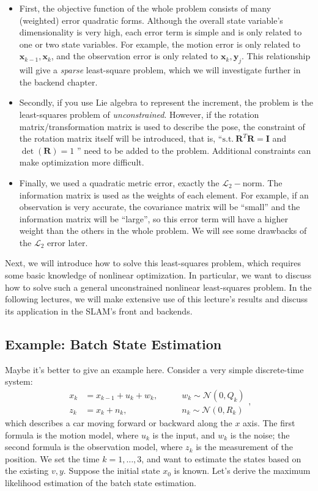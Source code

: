 \begin{itemize}
	\item First, the objective function of the whole problem consists of many (weighted) error quadratic forms. Although the overall state variable's dimensionality is very high, each error term is simple and is only related to one or two state variables. For example, the motion error is only related to $\mathbf{x}_{k-1}, \mathbf{x}_k$, and the observation error is only related to $\mathbf{x}_k, \mathbf{y}_j$. This relationship will give a \textit{sparse} least-square problem, which we will investigate further in the backend chapter.
	\item Secondly, if you use Lie algebra to represent the increment, the problem is the least-squares problem of \textit{unconstrained}. However, if the rotation matrix/transformation matrix is ​​used to describe the pose, the constraint of the rotation matrix itself will be introduced, that is, ``$\mathrm{s.t.}\ \mathbf{R}^T \mathbf{R} = \mathbf{I}$ and $\det (\mathbf{R})=1$ '' need to be added to the problem. Additional constraints can make optimization more difficult.
	\item Finally, we used a quadratic metric error, exactly the $\mathcal{L}_2-$norm. The information matrix is used as the weights of each element. For example, if an observation is very accurate, the covariance matrix will be ``small'' and the information matrix will be ``large'', so this error term will have a higher weight than the others in the whole problem. We will see some drawbacks of the $\mathcal{L}_2$ error later.
\end{itemize}

Next, we will introduce how to solve this least-squares problem, which requires some basic knowledge of nonlinear optimization. In particular, we want to discuss how to solve such a general unconstrained nonlinear least-squares problem. In the following lectures, we will make extensive use of this lecture's results and discuss its application in the SLAM's front and backends.

\subsection{Example: Batch State Estimation}
Maybe it's better to give an example here. Consider a very simple discrete-time system:
\begin{equation}
    \begin{array}{lll}
        {x_k} &= {x_{k-1}} + {u_k} + {w_k},&\qquad w_k \sim \mathcal{N}\left( {0,Q_k} \right)\\
        {z_k} &= {x_k} + {n_k},&\qquad {n_k}\sim \mathcal{N}\left( {0,R_k} \right)
    \end{array},
\end{equation}
which describes a car moving forward or backward along the $x$ axis. The first formula is the motion model, where $u_k$ is the input, and $w_k$ is the noise; the second formula is the observation model, where $z_k$ is the measurement of the position. We set the time $k=1,\ldots,3$, and want to estimate the states based on the existing $v,y$. Suppose the initial state $x_0$ is known. Let's derive the maximum likelihood estimation of the batch state estimation.

